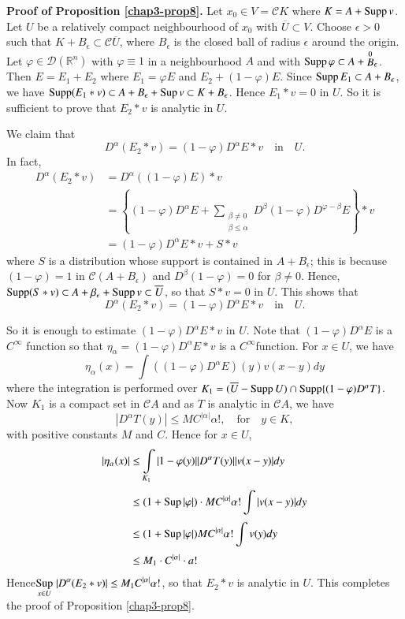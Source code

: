 \noindent
{\bf Proof of Proposition \ref{chap3-prop8}.} 
Let $x_{0}\in V=\mathcal{C}K$ where $K=A+\operatorname{Supp} v$. Let $U$ be a relatively
compact neighbourhood of $x_{0}$ with $\overline{U}\subset V$. Choose
$\epsilon>0$ such that $K+B_{\epsilon}\subset \mathcal{C}\overline{U}$, where
$B_{\epsilon}$ is the closed ball of radius $\epsilon$ around the
origin. Let $\varphi\in \mathcal{D}(\mathbb{R}^{n})$ with
$\varphi\equiv 1$ in a neighbourhood $A$ and with $\operatorname{Supp}
\varphi\subset A+\displaystyle{\mathop{B}^{0}}_{\epsilon}$. Then
$E=E_{1}+E_{2}$ where $E_{1}=\varphi E$ and
$E_{2}+(1-\varphi)E$. Since $\operatorname{Supp} E_{1}\subset A+B_{\epsilon}$, we
have $\operatorname{Supp} (E_{1}\ast v)\subset A+B_{\epsilon}+\operatorname{Sup} v\subset
K+B_{\epsilon}$. Hence $E_{1}\ast v=0$ in $U$. So it is sufficient to
prove that $E_{2}\ast v$ is analytic in $U$.

We claim that
$$
D^{\alpha}(E_{2}\ast v)=(1-\varphi)D^{\alpha}E\ast
v\quad\text{in}\quad U.
$$ 
In fact,
\begin{align*}
D^{\alpha}(E_{2}\ast v) &= D^{\alpha}((1-\varphi)E)\ast v\\[3pt]
&= \left\{(1-\varphi)D^{\alpha}E+\sum\limits_{\substack{\beta\neq
    0\\ \beta\leq \alpha}}
D^{\beta}(1-\varphi)D^{\varphi-\beta}E\right\}\ast v\\[4pt]
&= (1-\varphi)D^{\alpha}E\ast v+S\ast v
\end{align*}
where $S$ is a distribution whose support is contained in
$A+B_{\epsilon}$; this is because $(1-\varphi)=1$ in
$\mathcal{C}(A+B_{\epsilon})$ and $D^{\beta}(1-\varphi)=0$ for $\beta\neq
0$. Hence, $\operatorname{Supp} (S\ast v)\subset A+\beta_{\epsilon}+\operatorname{Supp} v\subset
\overline{U}$, so that $S\ast v=0$ in $U$. This shows that
$$
D^{\alpha}(E_{2}\ast v)=(1-\varphi)D^{\alpha}E\ast
v\quad\text{in}\quad U.
$$

So it is enough to estimate $(1-\varphi)D^{\alpha}E\ast v$ in
$U$. Note that $(1-\varphi)D^{\alpha}E$ is a $C^{\infty}$ function so
that $\eta_{\alpha}=(1-\varphi)D^{\alpha}E\ast v$ is a
$C^{\infty}$\pageoriginale function. For $x\in U$, we have
$$
\eta_{\alpha}(x)=\int ((1-\varphi)D^{\alpha}E)(y)v(x-y)dy
$$
where the integration is performed over $K_{1}=(\overline{U}-\operatorname{Supp}
U)\cap \operatorname{Supp} \{(1-\varphi)D^{\alpha}T\}$. Now $K_{1}$ is a compact set
in $\mathcal{C}A$ and as $T$ is analytic in $\mathcal{C}A$, we have
$$
|D^{\alpha}T(y)|\leq MC^{|\alpha|}\alpha!,\quad\text{for}\quad y\in K,
$$
with positive constants $M$ and $C$. Hence for $x\in U$,
\begin{align*}
|\eta_{\alpha}(x)| &\leq
\int\limits_{K_{1}}|1-\varphi(y)||D^{\alpha}T(y)||v(x-y)|dy\\[3pt]
&\leq (1+\operatorname{Sup} |\varphi|)\cdot MC^{|\alpha|}\alpha!\int
|v(x-y)|dy\\[3pt]
&\leq (1+\operatorname{Sup} |\varphi|)MC^{|\alpha|}\alpha!\int v(y)dy\\[3pt]
&\leq M_{1}\cdot C^{|\alpha|}\cdot a!
\end{align*}
Hence\quad $\displaystyle{\mathop{\operatorname{Sup}}_{x\in U}}\;|D^{\alpha}(E_{2}\ast
  v)|\leq M_{1}C^{|\alpha|}\alpha!$, so that $E_{2}\ast v$ is analytic
  in $U$. This completes the proof of Proposition \ref{chap3-prop8}.

